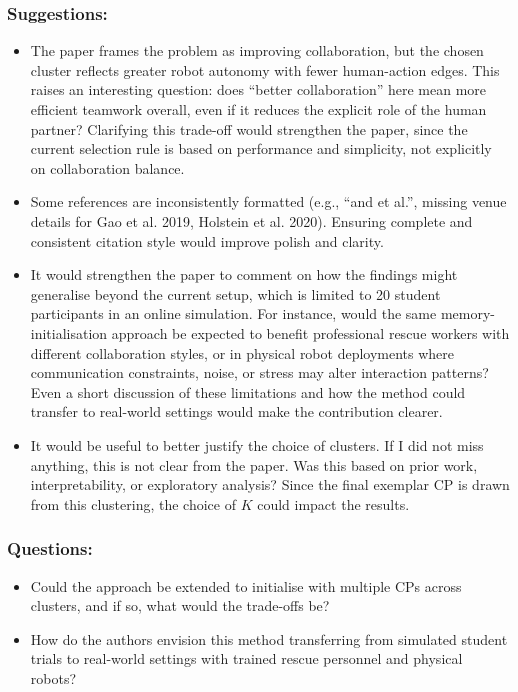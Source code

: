 \documentclass[letterpaper]{article} %
\begin{document}
\subsubsection*{Suggestions:}
\begin{itemize}
\item The paper frames the problem as improving collaboration, but the chosen cluster reflects greater robot autonomy with fewer human-action edges. This raises an interesting question: does ``better collaboration'' here mean more efficient teamwork overall, even if it reduces the explicit role of the human partner? Clarifying this trade-off would strengthen the paper, since the current selection rule is based on performance and simplicity, not explicitly on collaboration balance.
\item Some references are inconsistently formatted (e.g., ``and et al.'', missing venue details for Gao et al. 2019, Holstein et al. 2020). Ensuring complete and consistent citation style would improve polish and clarity.
\item It would strengthen the paper to comment on how the findings might generalise beyond the current setup, which is limited to 20 student participants in an online simulation. For instance, would the same memory-initialisation approach be expected to benefit professional rescue workers with different collaboration styles, or in physical robot deployments where communication constraints, noise, or stress may alter interaction patterns? Even a short discussion of these limitations and how the method could transfer to real-world settings would make the contribution clearer. 
\item It would be useful to better justify the choice of clusters. If I did not miss anything, this is not clear from the paper. Was this based on prior work, interpretability, or exploratory analysis? Since the final exemplar CP is drawn from this clustering, the choice of $K$ could impact the results.
\end{itemize}

\subsubsection*{Questions:}
\begin{itemize}
\item Could the approach be extended to initialise with multiple CPs across clusters, and if so, what would the trade-offs be?
\item How do the authors envision this method transferring from simulated student trials to real-world settings with trained rescue personnel and physical robots?
\end{itemize}
\end{document}
